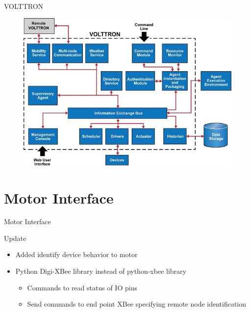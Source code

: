\documentclass{beamer}
\begin{document}
\begin{frame}{VOLTTRON}
\begin{figure}
\centering
\includegraphics[scale=0.5]{../figs/volttronoverview.png}
\end{figure}
\end{frame}

\section{Motor Interface}

\begin{frame}{Motor Interface}
\begin{block}{Update}
\begin{itemize}
\item Added identify device behavior to motor
\item Python Digi-XBee library instead of python-xbee library
\begin{itemize}
	\item Commands to read status of IO pins
	\item Send commands to end point XBee specifying remote node identification
\end{itemize}
\end{itemize}
\end{block}
\end{frame}
\end{document}
